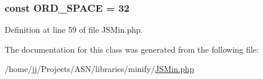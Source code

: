 \subsubsection[{\texorpdfstring{O\+R\+D\+\_\+\+S\+P\+A\+CE}{ORD_SPACE}}]{\setlength{\rightskip}{0pt plus 5cm}const O\+R\+D\+\_\+\+S\+P\+A\+CE = 32}\hypertarget{class_j_s_min_ae1d4e1296e34ef6f2ca1afd327ec3d9c}{}\label{class_j_s_min_ae1d4e1296e34ef6f2ca1afd327ec3d9c}


Definition at line 59 of file J\+S\+Min.\+php.



The documentation for this class was generated from the following file\+:\begin{DoxyCompactItemize}
\item 
/home/jj/\+Projects/\+A\+S\+N/libraries/minify/\hyperlink{_j_s_min_8php}{J\+S\+Min.\+php}\end{DoxyCompactItemize}

